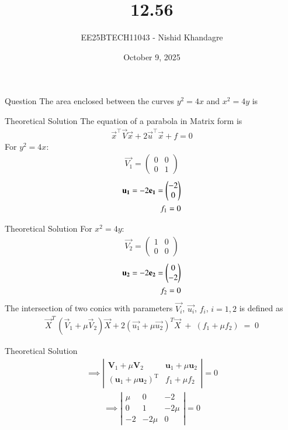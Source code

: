 \documentclass{beamer}
\title
{12.56}
\date{October 9, 2025}
\author
{EE25BTECH11043 - Nishid Khandagre}
\begin{document}
\frame{\titlepage}

\begin{frame}{Question}
The area enclosed between the curves $y^2 = 4x$ and $x^2 = 4y$ is 
\end{frame}

\begin{frame}{Theoretical Solution}
The equation of a parabola in Matrix form is
\begin{align}
\vec{x}^\top\vec{V}\vec{x} + 2\vec{u}^\top\vec{x} + f = 0
\end{align}
For $y^2 = 4x$:
\begin{align}
    \vec{V_1}=\begin{pmatrix}
        0 & 0\\
        0 & 1
    \end{pmatrix}
\end{align}
\begin{align}
    \mathbf{u_1}=-2\mathbf{e_1}=\begin{pmatrix}-2\\0\end{pmatrix}\\
    f_1=0
\end{align}
\end{frame}

\begin{frame}{Theoretical Solution}
For $x^2 = 4y$:
\begin{align}
    \vec{V_2}=\begin{pmatrix}
        1 & 0\\
        0 & 0
    \end{pmatrix}
\end{align}
\begin{align}
    \mathbf{u_2}=-2\mathbf{e_2}=\begin{pmatrix}0\\-2\end{pmatrix}\\
    f_2=0
\end{align}
The intersection of two conics with parameters $\vec{V_i}$, $\vec{u_i}$, $f_i$, $i=1,2$ is defined as 
\begin{align}
\vec{X}^{T}\,(\vec{V}_{1} + \mu \vec{V}_{2})\vec{X} + 2(\vec{u_1} + \mu \vec{u_2})^{T}\vec{X} \;+\; (f_{1} + \mu f_{2}) \;=\; 0 \label{eq:tem}
\end{align}
\end{frame}

\begin{frame}{Theoretical Solution}
\begin{align}
\implies \left|
\begin{array}{cc}
\mathbf{V}_1 + \mu \mathbf{V}_2 & \mathbf{u}_1 + \mu \mathbf{u}_2 \\[6pt]
(\mathbf{u}_1 + \mu \mathbf{u}_2)^{\mathrm{T}} & f_1 + \mu f_2
\end{array}
\right| = 0
\end{align}
\begin{align}
    \implies 
\left|
\begin{array}{ccc}
\mu & 0 & -2 \\[6pt]
0 & 1  & -2\mu \\[6pt]
-2 & -2\mu & 0
\end{array}
\right| = 0 
\end{align}
\end{frame}
\end{document}
